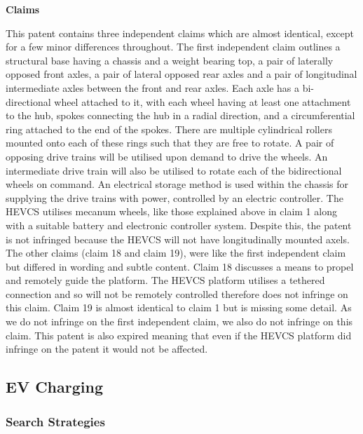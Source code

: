\documentclass [12pt]{article}
\begin{document}
\textbf{Claims}

This patent contains three independent claims which are almost identical, except for a few minor differences throughout.
The first independent claim outlines a structural base having a chassis and a weight bearing top, a pair of laterally opposed front axles, a pair of lateral opposed rear axles and a pair of longitudinal intermediate axles between the front and rear axles. Each axle has a bi-directional wheel attached to it, with each wheel having at least one attachment to the hub, spokes connecting the hub in a radial direction, and a circumferential ring attached to the end of the spokes. There are multiple cylindrical rollers mounted onto each of these rings such that they are free to rotate. A pair of opposing drive trains will be utilised upon demand to drive the wheels. An intermediate drive train will also be utilised to rotate each of the bidirectional wheels on command. An electrical storage method is used within the chassis for supplying the drive trains with power, controlled by an electric controller.
The HEVCS utilises mecanum wheels, like those explained above in claim 1 along with a suitable battery and electronic controller system. Despite this, the patent is not infringed because the HEVCS will not have longitudinally mounted axels.
The other claims (claim 18 and claim 19), were like the first independent claim but differed in wording and subtle content.
Claim 18 discusses a means to propel and remotely guide the platform. The HEVCS platform utilises a tethered connection and so will not be remotely controlled therefore does not infringe on this claim.
Claim 19 is almost identical to claim 1 but is missing some detail.
As we do not infringe on the first independent claim, we also do not infringe on this claim.
This patent is also expired meaning that even if the HEVCS platform did infringe on the patent it would not be affected.



\subsection{EV Charging}\label{sec:ev_charging}

\cite{Home_Chargepoints}

\subsubsection{Search Strategies}\label{sec:EV_Charging_Search_Term}
\end{document}
